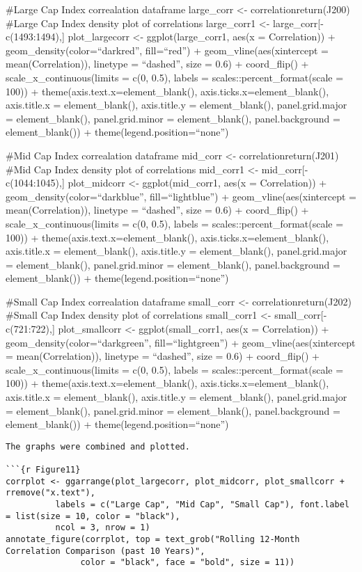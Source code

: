 \documentclass[
]{article}
\begin{document}
\#Large Cap Index correalation dataframe large\_corr \textless-
correlationreturn(J200) \#Large Cap Index density plot of correlations
large\_corr1 \textless- large\_corr{[}-c(1493:1494),{]} plot\_largecorr
\textless- ggplot(large\_corr1, aes(x = Correlation)) +
geom\_density(color=``darkred'', fill=``red'') +
geom\_vline(aes(xintercept = mean(Correlation)), linetype = ``dashed'',
size = 0.6) + coord\_flip() + scale\_x\_continuous(limits = c(0, 0.5),
labels = scales::percent\_format(scale = 100)) +
theme(axis.text.x=element\_blank(), axis.ticks.x=element\_blank(),
axis.title.x = element\_blank(), axis.title.y = element\_blank(),
panel.grid.major = element\_blank(), panel.grid.minor =
element\_blank(), panel.background = element\_blank()) +
theme(legend.position=``none'')

\#Mid Cap Index correalation dataframe mid\_corr \textless-
correlationreturn(J201) \#Mid Cap Index density plot of correlations
mid\_corr1 \textless- mid\_corr{[}-c(1044:1045),{]} plot\_midcorr
\textless- ggplot(mid\_corr1, aes(x = Correlation)) +
geom\_density(color=``darkblue'', fill=``lightblue'') +
geom\_vline(aes(xintercept = mean(Correlation)), linetype = ``dashed'',
size = 0.6) + coord\_flip() + scale\_x\_continuous(limits = c(0, 0.5),
labels = scales::percent\_format(scale = 100)) +
theme(axis.text.x=element\_blank(), axis.ticks.x=element\_blank(),
axis.title.x = element\_blank(), axis.title.y = element\_blank(),
panel.grid.major = element\_blank(), panel.grid.minor =
element\_blank(), panel.background = element\_blank()) +
theme(legend.position=``none'')

\#Small Cap Index correalation dataframe small\_corr \textless-
correlationreturn(J202) \#Small Cap Index density plot of correlations
small\_corr1 \textless- small\_corr{[}-c(721:722),{]} plot\_smallcorr
\textless- ggplot(small\_corr1, aes(x = Correlation)) +
geom\_density(color=``darkgreen'', fill=``lightgreen'') +
geom\_vline(aes(xintercept = mean(Correlation)), linetype = ``dashed'',
size = 0.6) + coord\_flip() + scale\_x\_continuous(limits = c(0, 0.5),
labels = scales::percent\_format(scale = 100)) +
theme(axis.text.x=element\_blank(), axis.ticks.x=element\_blank(),
axis.title.x = element\_blank(), axis.title.y = element\_blank(),
panel.grid.major = element\_blank(), panel.grid.minor =
element\_blank(), panel.background = element\_blank()) +
theme(legend.position=``none'')

\begin{verbatim}
The graphs were combined and plotted. 

```{r Figure11}
corrplot <- ggarrange(plot_largecorr, plot_midcorr, plot_smallcorr + rremove("x.text"), 
          labels = c("Large Cap", "Mid Cap", "Small Cap"), font.label = list(size = 10, color = "black"),
          ncol = 3, nrow = 1)
annotate_figure(corrplot, top = text_grob("Rolling 12-Month Correlation Comparison (past 10 Years)", 
               color = "black", face = "bold", size = 11))
\end{verbatim}
\end{document}

